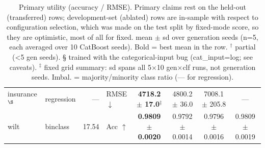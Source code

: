 \begin{table}[t]
\begin{tabular}{llrlcccc}
insurance$^\S$ & regression & — & RMSE $\downarrow$ & \textbf{4718.2 $\pm$ 17.0}$^\ddagger$ & 4800.2 $\pm$ 36.0 & 7008.1 $\pm$ 205.8 & --- \\
wilt & binclass & 17.54 & Acc $\uparrow$ & \textbf{0.9809 $\pm$ 0.0020} & 0.9792 $\pm$ 0.0014 & 0.9796 $\pm$ 0.0016 & 0.9809 $\pm$ 0.0019 \\
\bottomrule
\end{tabular}
\caption{Primary utility (accuracy / RMSE). Primary claims rest on the held-out (transferred) rows; development-set (ablated) rows are in-sample with respect to configuration selection, which was made on the test split by fixed-mode score, so they are optimistic, most of all for fixed. mean $\pm$ sd over generation seeds (n=5, each averaged over 10 CatBoost seeds). Bold = best mean in the row. $^\dagger$ partial (<5 gen seeds). § trained with the categorical-input bug (cat_input=log; see caveats). $^\ddagger$ fixed grid summary: sd spans all 5$\times$10 gen$\times$clf runs, not generation seeds. Imbal. = majority/minority class ratio (— for regression).}
\end{table}
